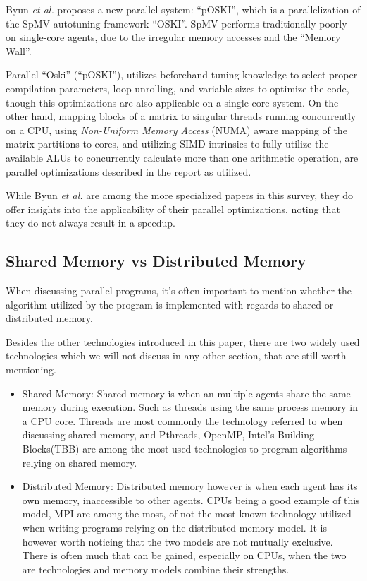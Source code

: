 Byun \textit{et al.}\cite{Byun:EECS-2012-215} proposes a new parallel system: ``pOSKI'', which is a parallelization of the SpMV autotuning framework ``OSKI''.
SpMV performs traditionally poorly on single-core agents, due to the irregular memory accesses and the ``Memory Wall''.

Parallel ``Oski'' (``pOSKI''), utilizes beforehand tuning knowledge to select proper compilation parameters, loop unrolling, and variable sizes to optimize the code, though this optimizations are also applicable on a single-core system.
On the other hand, mapping blocks of a matrix to singular threads running concurrently on a CPU, using \textit{Non-Uniform Memory Access} (NUMA) aware mapping of the matrix partitions to cores, and utilizing SIMD intrinsics to fully utilize the available ALUs to concurrently calculate more than one arithmetic operation, are parallel optimizations described in the report as utilized.

While Byun \textit{et al.}\cite{Byun:EECS-2012-215} are among the more specialized papers in this survey, they do offer insights into the applicability of their parallel optimizations, noting that they do not always result in a speedup.

\subsection{Shared Memory vs Distributed Memory}

When discussing parallel programs, it's often important to mention whether the algorithm utilized by the program is implemented with regards to shared or distributed memory.

Besides the other technologies introduced in this paper, there are two widely used technologies which we will not discuss in any other section, that are still worth mentioning.

\begin{itemize}
	\item{Shared Memory:}
	Shared memory is when an multiple agents share the same memory during execution. Such as threads using the same process memory in a CPU core.
	Threads are most commonly the technology referred to when discussing shared memory, and Pthreads, OpenMP, Intel's Building Blocks\texttrademark (TBB) are among the most used technologies to program algorithms relying on shared memory.
	\item{Distributed Memory:}
		Distributed memory however is when each agent has its own memory, inaccessible to other agents.
		CPUs being a good example of this model, MPI are among the most, of not the most known technology utilized when writing programs relying on the distributed memory model.
		It is however worth noticing that the two models are not mutually exclusive.
		There is often much that can be gained, especially on CPUs, when the two are technologies and memory models combine their strengths.
\end{itemize}

